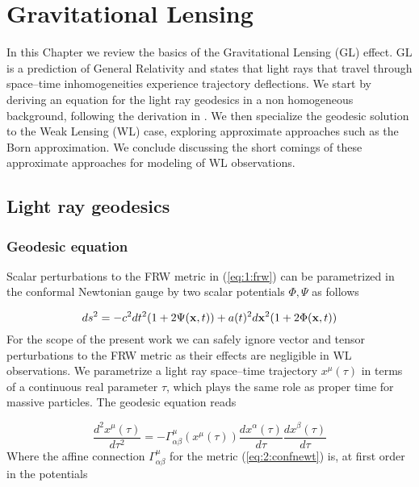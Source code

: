 
\chapter{Gravitational Lensing}
\lhead[\fancyplain{}{\thepage}]{\fancyplain{}{\rightmark}}
 \thispagestyle{plain}
\setlength{\parindent}{10mm}


In this Chapter we review the basics of the Gravitational Lensing (GL) effect. GL is a prediction of General Relativity and states that light rays that travel through space--time inhomogeneities experience trajectory deflections. We start by deriving an equation for the light ray geodesics in a non homogeneous background, following the derivation in \citep{Dodelson-C11}. We then specialize the geodesic solution to the Weak Lensing (WL) case, exploring approximate approaches such as the Born approximation. We conclude discussing the short comings of these approximate approaches for modeling of WL observations. 

\section{Light ray geodesics}

\subsection{Geodesic equation}
Scalar perturbations to the FRW metric in (\ref{eq:1:frw}) can be parametrized in the conformal Newtonian gauge by two scalar potentials $\Phi,\Psi$ as follows

\begin{equation}
\label{eq:2:confnewt}
ds^2 = -c^2dt^2(1+2\Psi(\mathbf{x},t)) + a(t)^2d\mathbf{x}^2(1+2\Phi(\mathbf{x},t))
\end{equation}
%
For the scope of the present work we can safely ignore vector and tensor perturbations to the FRW metric as their effects are negligible in WL observations. We parametrize a light ray space--time trajectory $x^\mu(\tau)$ in terms of a continuous real parameter $\tau$, which plays the same role as proper time for massive particles. The geodesic equation reads 

\begin{equation}
\label{eq:2:geodesic}
\frac{d^2 x^\mu(\tau)}{d\tau^2} = -\Gamma_{\alpha\beta}^\mu(x^\mu(\tau)) \frac{d x^\alpha(\tau)}{d\tau}\frac{d x^\beta(\tau)}{d\tau}
\end{equation}
%
Where the affine connection $\Gamma_{\alpha\beta}^\mu$ for the metric (\ref{eq:2:confnewt}) is, at first order in the potentials

